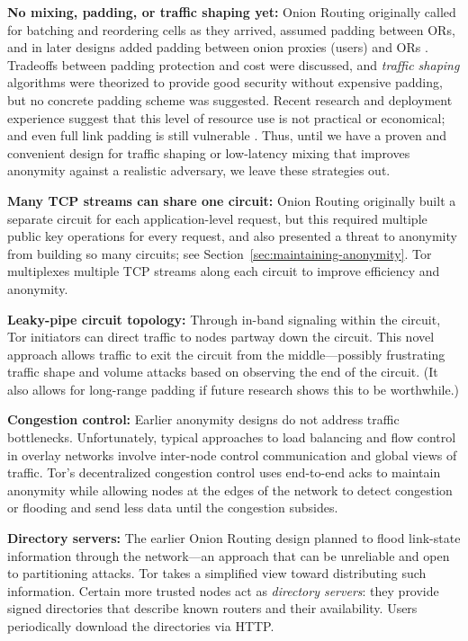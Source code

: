\documentclass[times,10pt,twocolumn]{article}
\begin{document}
\textbf{No mixing, padding, or traffic shaping yet:} Onion
Routing originally called for batching and reordering cells as they arrived,
assumed padding between ORs, and in
later designs added padding between onion proxies (users) and ORs
\cite{or-ih96,or-jsac98}.  Tradeoffs between padding protection
and cost were discussed, and \emph{traffic shaping} algorithms were
theorized \cite{or-pet00} to provide good security without expensive
padding, but no concrete padding scheme was suggested.
Recent research \cite{econymics}
and deployment experience \cite{freedom21-security} suggest that this
level of resource use is not practical or economical; and even full
link padding is still vulnerable \cite{defensive-dropping}. Thus,
until we have a proven and convenient design for traffic shaping or
low-latency mixing that improves anonymity against a realistic
adversary, we leave these strategies out.

\textbf{Many TCP streams can share one circuit:} Onion Routing originally
built a separate circuit for each
application-level request, but this required
multiple public key operations for every request, and also presented
a threat to anonymity from building so many circuits; see
Section~\ref{sec:maintaining-anonymity}.  Tor multiplexes multiple TCP
streams along each circuit to improve efficiency and anonymity.

\textbf{Leaky-pipe circuit topology:} Through in-band signaling
within the circuit, Tor initiators can direct traffic to nodes partway
down the circuit. This novel approach 
allows traffic to exit the circuit from the middle---possibly
frustrating traffic shape and volume attacks based on observing the end
of the circuit. (It also allows for long-range padding if
future research shows this to be worthwhile.)

\textbf{Congestion control:} Earlier anonymity designs do not
address traffic bottlenecks. Unfortunately, typical approaches to
load balancing and flow control in overlay networks involve inter-node
control communication and global views of traffic. Tor's decentralized
congestion control uses end-to-end acks to maintain anonymity
while allowing nodes at the edges of the network to detect congestion
or flooding and send less data until the congestion subsides.

\textbf{Directory servers:} The earlier Onion Routing design
planned to flood link-state information through the network---an approach
that can be unreliable and open to partitioning attacks.
Tor takes a simplified view toward distributing such
information. Certain more trusted nodes act as \emph{directory
servers}: they provide signed directories that describe known
routers and their availability. Users periodically download the
directories via HTTP.
\end{document}
